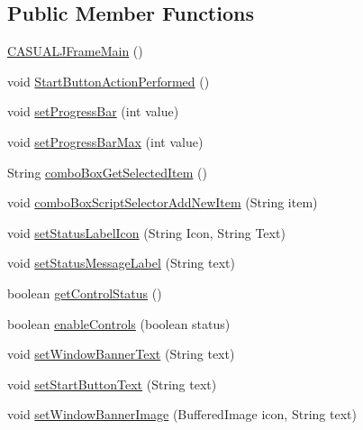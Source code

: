 \subsection*{Public Member Functions}
\begin{DoxyCompactItemize}
\item 
\hyperlink{classGUI_1_1development_1_1CASUALJFrameMain_ac484fbc9062062c993329838cc699127}{C\-A\-S\-U\-A\-L\-J\-Frame\-Main} ()
\item 
void \hyperlink{classGUI_1_1development_1_1CASUALJFrameMain_a019f07e0dcd01688f121d01a6a4f08fb}{Start\-Button\-Action\-Performed} ()
\item 
void \hyperlink{classGUI_1_1development_1_1CASUALJFrameMain_ab5a2bd6f9960330e92ec832a037d8475}{set\-Progress\-Bar} (int value)
\item 
void \hyperlink{classGUI_1_1development_1_1CASUALJFrameMain_aea01e24b1f4fd89b0b362527eb07bc9b}{set\-Progress\-Bar\-Max} (int value)
\item 
String \hyperlink{classGUI_1_1development_1_1CASUALJFrameMain_a65473b796550f93cd0a64fbdc008e321}{combo\-Box\-Get\-Selected\-Item} ()
\item 
void \hyperlink{classGUI_1_1development_1_1CASUALJFrameMain_ad67026cebd68aaa9d5e50a1d772e890b}{combo\-Box\-Script\-Selector\-Add\-New\-Item} (String item)
\item 
void \hyperlink{classGUI_1_1development_1_1CASUALJFrameMain_a6abde49bfe2650f447b5c6abc7d6f077}{set\-Status\-Label\-Icon} (String Icon, String Text)
\item 
void \hyperlink{classGUI_1_1development_1_1CASUALJFrameMain_ad655b0e480491023e7ad25af422c95a9}{set\-Status\-Message\-Label} (String text)
\item 
boolean \hyperlink{classGUI_1_1development_1_1CASUALJFrameMain_af0f386b4ecdf89d6eaa43dc78cd4f6ef}{get\-Control\-Status} ()
\item 
boolean \hyperlink{classGUI_1_1development_1_1CASUALJFrameMain_ae8a8f3e56ff374c6274633ed621dc815}{enable\-Controls} (boolean status)
\item 
void \hyperlink{classGUI_1_1development_1_1CASUALJFrameMain_ab21ac8cd692ec2a63ae0339bb68e374e}{set\-Window\-Banner\-Text} (String text)
\item 
void \hyperlink{classGUI_1_1development_1_1CASUALJFrameMain_a9e5b6e12ea7e3967c9f628788e3bc860}{set\-Start\-Button\-Text} (String text)
\item 
void \hyperlink{classGUI_1_1development_1_1CASUALJFrameMain_a61c6f0a35b429a38f63317e05afaf921}{set\-Window\-Banner\-Image} (Buffered\-Image icon, String text)

\end{DoxyCompactItemize}
